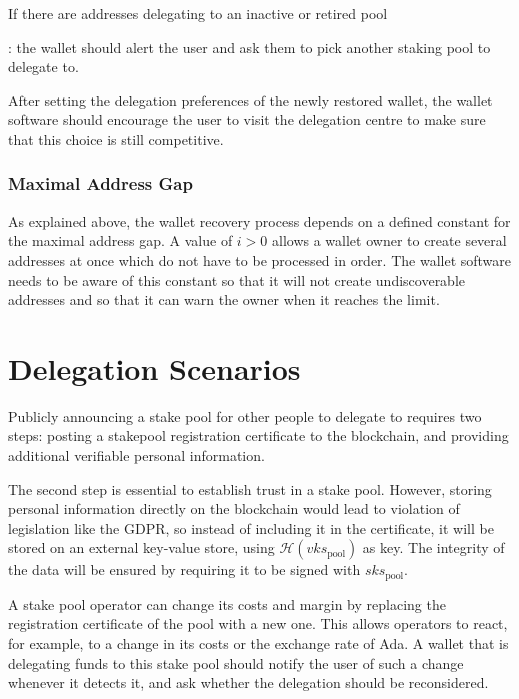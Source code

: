 \documentclass[11pt,a4paper]{article}
\begin{document}
If there are addresses delegating to an inactive or retired pool

: the wallet should alert the user and ask them to pick another staking
pool to delegate to.

After setting the delegation preferences of the newly restored wallet,
the wallet software should encourage the user to visit the delegation
centre to make sure that this choice is still competitive.

\subsubsection{Maximal Address Gap}\label{maximal-address-gap}

As explained above, the wallet recovery process depends on a defined
constant for the maximal address gap. A value of \(i>0\) allows a wallet
owner to create several addresses at once which do not have to be
processed in order. The wallet software needs to be aware of this
constant so that it will not create undiscoverable addresses and so that
it can warn the owner when it reaches the limit.

\section{Delegation Scenarios}\label{delegation-scenarios}


Publicly announcing a stake pool for other people to delegate to
requires two steps: posting a stakepool registration certificate to the
blockchain, and providing additional verifiable personal information.

The second step is essential to establish trust in a stake pool.
However, storing personal information directly on the blockchain would
lead to violation of legislation like the GDPR, so instead of including
it in the certificate, it will be stored on an external key-value store,
using \(\mathcal{H}(vks_\text{pool})\) as key. The integrity of the data
will be ensured by requiring it to be signed with \(sks_\text{pool}\).

A stake pool operator can change its costs and margin by replacing the
registration certificate of the pool with a new one. This allows
operators to react, for example, to a change in its costs or the
exchange rate of Ada. A wallet that is delegating funds to this stake
pool should notify the user of such a change whenever it detects it, and
ask whether the delegation should be reconsidered.
\end{document}
